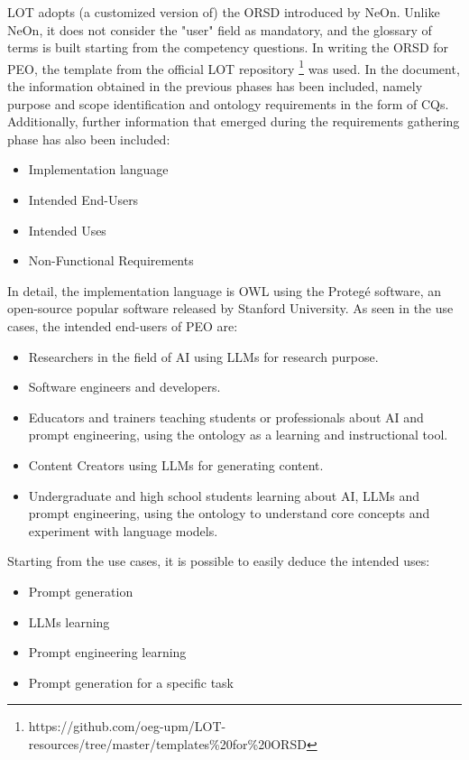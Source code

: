 LOT adopts (a customized version of) the ORSD introduced by NeOn.
Unlike NeOn, it does not consider the "user" field as mandatory, and the glossary of terms is built starting from the competency questions.
In writing the ORSD for PEO, the  template from the official LOT repository \footnote{https://github.com/oeg-upm/LOT-resources/tree/master/templates\%20for\%20ORSD} was used. 
In the document, the information obtained in the previous phases has been included, namely purpose and scope identification and ontology requirements in the form of CQs.
Additionally, further information that emerged during the requirements gathering phase has also been included:
\begin{itemize}
    \item Implementation language 
    \item Intended End-Users 
    \item Intended Uses
    \item Non-Functional Requirements
\end{itemize}
In detail, the implementation language is OWL using the Protegé software\cite{protege_sw}, an open-source popular software released by Stanford University.
As seen in the use cases, the intended end-users of PEO are:
\begin{itemize}
    \item Researchers in the field of AI using LLMs for research purpose.
    \item Software engineers and developers.
    \item Educators and trainers teaching students or professionals about AI and prompt engineering, using the ontology as a learning and instructional tool.
    \item Content Creators using LLMs for generating content.
    \item Undergraduate and high school students learning about AI, LLMs and prompt engineering, using the ontology to understand core concepts and experiment with language models.
\end{itemize}
Starting from the use cases, it is possible to easily deduce the intended uses:
\begin{itemize}
    \item Prompt generation
    \item LLMs learning
    \item Prompt engineering learning
    \item Prompt generation for a specific task
\end{itemize}
